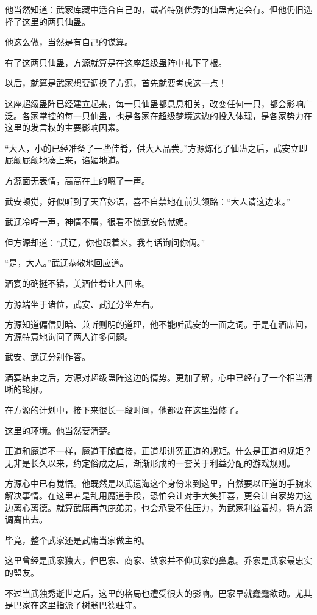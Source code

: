 \begin{this_body}
他当然知道：武家库藏中适合自己的，或者特别优秀的仙蛊肯定会有。但他仍旧选择了这里的两只仙蛊。

他这么做，当然是有自己的谋算。

有了这两只仙蛊，方源就算是在这座超级蛊阵中扎下了根。

以后，就算是武家想要调换了方源，首先就要考虑这一点！

这座超级蛊阵已经建立起来，每一只仙蛊都息息相关，改变任何一只，都会影响广泛。各家掌控的每一只仙蛊，也是各家在超级梦境这边的投入体现，是各家势力在这里的发言权的主要影响因素。

“大人，小的已经准备了一些佳肴，供大人品尝。”方源炼化了仙蛊之后，武安立即屁颠屁颠地凑上来，谄媚地道。

方源面无表情，高高在上的嗯了一声。

武安顿觉，好似听到了天音妙语，喜不自禁地在前头领路：“大人请这边来。”

武辽冷哼一声，神情不屑，很看不惯武安的献媚。

但方源却道：“武辽，你也跟着来。我有话询问你俩。”

“是，大人。”武辽恭敬地回应道。

酒宴的确挺不错，美酒佳肴让人回味。

方源端坐于诸位，武安、武辽分坐左右。

方源知道偏信则暗、兼听则明的道理，他不能听武安的一面之词。于是在酒席间，方源特意地询问了两人许多问题。

武安、武辽分别作答。

酒宴结束之后，方源对超级蛊阵这边的情势。更加了解，心中已经有了一个相当清晰的轮廓。

在方源的计划中，接下来很长一段时间，他都要在这里潜修了。

这里的环境。他当然要清楚。

正道和魔道不一样，魔道干脆直接，正道却讲究正道的规矩。什么是正道的规矩？无非是长久以来，约定俗成之后，渐渐形成的一套关于利益分配的游戏规则。

方源心中已有觉悟。他既然是以武遗海这个身份来到这里，自然要以正道的手腕来解决事情。在这里若是乱用魔道手段，恐怕会让对手大笑狂喜，更会让自家势力这边离心离德。就算武庸再包庇弟弟，也会承受不住压力，为武家利益着想，将方源调离出去。

毕竟，整个武家还是武庸当家做主的。

这里曾经是武家独大，但巴家、商家、铁家并不仰武家的鼻息。乔家是武家最忠实的盟友。

不过当武独秀逝世之后，这里的格局也遭受很大的影响。巴家早就蠢蠢欲动。尤其是巴家在这里指派了树翁巴德驻守。


\end{this_body}
